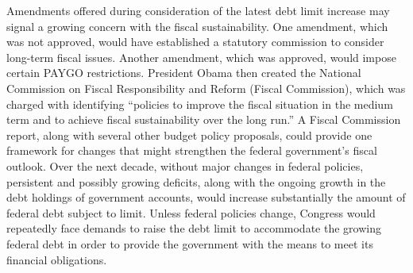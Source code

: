 \nextline
Amendments offered during consideration of the latest debt limit increase may signal a growing concern with the fiscal sustainability. One amendment, which was not approved, would have established a statutory commission to consider long-term fiscal issues. Another amendment, which was approved, would impose certain PAYGO restrictions. President Obama then created the National Commission on Fiscal Responsibility and Reform (Fiscal Commission), which was charged with identifying “policies to improve the fiscal situation in the medium term and to achieve fiscal sustainability over the long run.” A Fiscal Commission report, along with several other budget policy proposals, could provide one framework for changes that might strengthen the federal government’s fiscal outlook.
\nextline
Over the next decade, without major changes in federal policies, persistent and possibly growing deficits, along with the ongoing growth in the debt holdings of government accounts, would increase substantially the amount of federal debt subject to limit. Unless federal policies change, Congress would repeatedly face demands to raise the debt limit to accommodate the growing federal debt in order to provide the government with the means to meet its financial obligations.